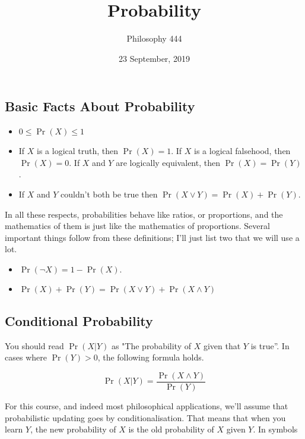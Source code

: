 \documentclass[11pt,]{article}
\title{Probability}
\author{Philosophy 444}
\date{23 September, 2019}
\providecommand{\tightlist}{%
  \setlength{\itemsep}{0pt}\setlength{\parskip}{0pt}}
\begin{document}
\maketitle

\hypertarget{basic-facts-about-probability}{%
\subsection{Basic Facts About
Probability}\label{basic-facts-about-probability}}

\begin{itemize}
\tightlist
\item
  \(0 \leq \Pr(X) \leq 1\)
\item
  If \(X\) is a logical truth, then \(\Pr(X) = 1\). If \(X\) is a
  logical falsehood, then \(\Pr(X) = 0\). If \(X\) and \(Y\) are
  logically equivalent, then \(\Pr(X) = \Pr(Y)\).
\item
  If \(X\) and \(Y\) couldn't both be true then
  \(\Pr(X \vee Y) = \Pr(X) + \Pr(Y)\).
\end{itemize}

In all these respects, probabilities behave like ratios, or proportions,
and the mathematics of them is just like the mathematics of proportions.
Several important things follow from these definitions; I'll just list
two that we will use a lot.

\begin{itemize}
\tightlist
\item
  \(\Pr(\neg X) = 1 - \Pr(X)\).
\item
  \(\Pr(X) + \Pr(Y) = \Pr(X \vee Y) + \Pr(X \wedge Y)\)
\end{itemize}

\hypertarget{conditional-probability}{%
\subsection{Conditional Probability}\label{conditional-probability}}

You should read \(\Pr(X | Y)\) as "The probability of \(X\) given that
\(Y\) is true''. In cases where \(\Pr(Y) > 0\), the following formula
holds.

\[
\Pr(X | Y) = \frac{\Pr(X \wedge Y)}{\Pr(Y)}
\]

For this course, and indeed most philosophical applications, we'll
assume that probabilistic updating goes by conditionalisation. That
means that when you learn \(Y\), the new probability of \(X\) is the old
probability of \(X\) given \(Y\). In symbols
\end{document}
